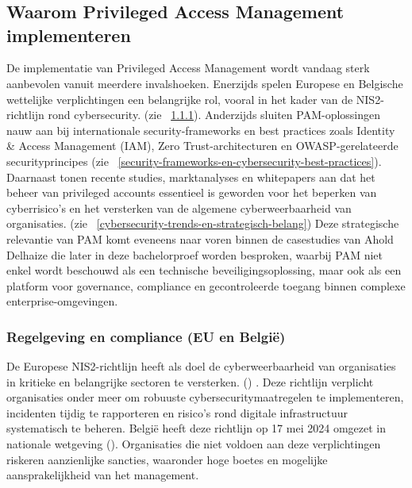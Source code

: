 \chapter{}%
\label{ch:stand-van-zaken}


\section{Waarom Privileged Access Management implementeren}
\label{ch:waarom-pam-implementeren}
De implementatie van Privileged Access Management wordt vandaag sterk aanbevolen vanuit meerdere invalshoeken. Enerzijds spelen Europese en Belgische wettelijke verplichtingen een belangrijke rol, vooral in het kader van de NIS2-richtlijn rond cybersecurity. (zie ~\ref{regelgeving-en-compliance-eu-en-belgie}). Anderzijds sluiten PAM-oplossingen nauw aan bij internationale security-frameworks en best practices zoals Identity & Access Management (IAM), Zero Trust-architecturen en OWASP-gerelateerde securityprincipes (zie ~\ref{security-frameworks-en-cybersecurity-best-practices}). Daarnaast tonen recente studies, marktanalyses en whitepapers aan dat het beheer van privileged accounts essentieel is geworden voor het beperken van cyberrisico’s en het versterken van de algemene cyberweerbaarheid van organisaties. (zie ~\ref{cybersecurity-trends-en-strategisch-belang})
Deze strategische relevantie van PAM komt eveneens naar voren binnen de casestudies van Ahold Delhaize die later in deze bachelorproef worden besproken, waarbij PAM niet enkel wordt beschouwd als een technische beveiligingsoplossing, maar ook als een platform voor governance, compliance en gecontroleerde toegang binnen complexe enterprise-omgevingen.

\subsection{Regelgeving en compliance (EU en België)}
\label{regelgeving-en-compliance-eu-en-belgie}
De Europese NIS2-richtlijn heeft als doel de cyberweerbaarheid van organisaties in kritieke en belangrijke sectoren te versterken. (\cite{NIS2_2022}) . Deze richtlijn verplicht organisaties onder meer om robuuste cybersecuritymaatregelen te implementeren, incidenten tijdig te rapporteren en risico’s rond digitale infrastructuur systematisch te beheren. België heeft deze richtlijn op 17 mei 2024 omgezet in nationale wetgeving (\cite{BelgischeNIS2Wet2024}).  Organisaties die niet voldoen aan deze verplichtingen riskeren aanzienlijke sancties, waaronder hoge boetes en mogelijke aansprakelijkheid van het management. 

